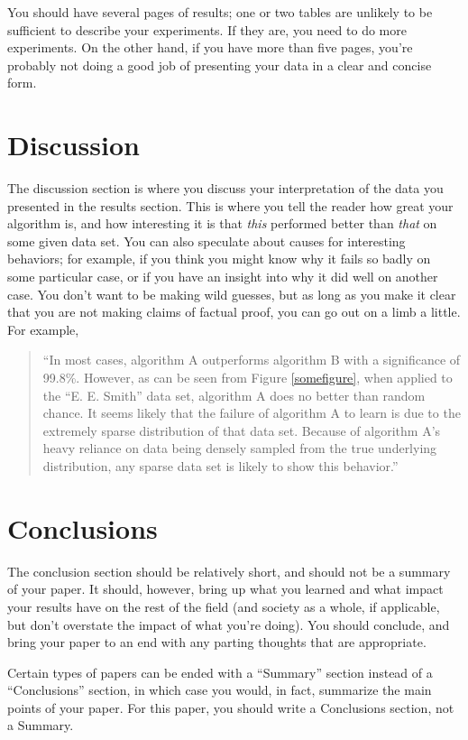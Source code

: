 \documentclass[12pt, letterpaper]{article}
\begin{document}
You should have several pages of results; one or two tables are unlikely to be
sufficient to describe your experiments.  If they are, you need to do more
experiments.  On the other hand, if you have more than five pages, you're
probably not doing a good job of presenting your data in a clear and concise
form.

\section{Discussion}
The discussion section is where you discuss your interpretation of the data you
presented in the results section.  This is where you tell the reader how great
your algorithm is, and how interesting it is that \emph{this} performed better
than \emph{that} on some given data set.  You can also speculate about causes
for interesting behaviors; for example, if you think you might know why it fails
so badly on some particular case, or if you have an insight into why it did well
on another case.  You don't want to be making wild guesses, but as long as you
make it clear that you are not making claims of factual proof, you can go out on
a limb a little.  For example,

\begin{quote}
``In most cases, algorithm A outperforms algorithm B with a significance of
99.8\%.  However, as can be seen from Figure \ref{somefigure}, when applied to
the ``E. E. Smith'' data set, algorithm A does no better than random chance.  It
seems likely that the failure of algorithm A to learn is due to the extremely
sparse distribution of that data set.  Because of algorithm A's heavy reliance
on data being densely sampled from the true underlying distribution, any sparse
data set is likely to show this behavior.''
\end{quote}

\section{Conclusions}
The conclusion section should be relatively short, and should not be a summary
of your paper.  It should, however, bring up what you learned and what impact
your results have on the rest of the field (and society as a whole, if
applicable, but don't overstate the impact of what you're doing).  You should
conclude, and bring your paper to an end with any parting thoughts that are
appropriate.

Certain types of papers can be ended with a ``Summary'' section instead of a
``Conclusions'' section, in which case you would, in fact, summarize the main
points of your paper.  For this paper, you should write a Conclusions section,
not a Summary.
\end{document}
